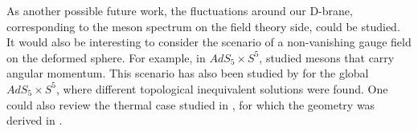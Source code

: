 As another possible future work, the fluctuations around our D-brane, corresponding to the meson spectrum on the field theory side, could be studied.
It would also be interesting to consider the scenario of a non-vanishing gauge field on the deformed sphere. For example, in $AdS_5 \times S^5$, \cite{Kruczenski:2003be} studied mesons that carry angular momentum. This scenario has also been studied by \cite{Karch:2015vra} for the global $AdS_5 \times S^5$, where different topological inequivalent solutions were found. One could also review the thermal case studied in \cite{Albash:2011dq}, for which the geometry was derived in \cite{Buchel:2003ah}.





